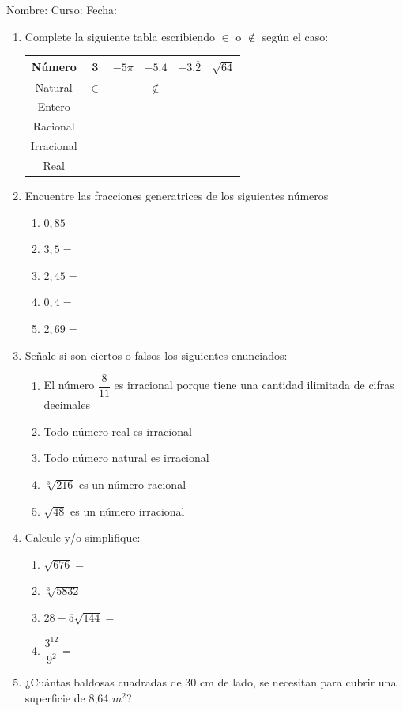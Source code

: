 \documentclass[fleqn]{article}
\newcommand{\LineaNombre}{%
\par
\vspace{\baselineskip}
Nombre:\hrulefill \; Curso: \underline{\hspace*{36pt}} \; Fecha: \underline{\hspace*{2.5cm}} \relax
\par}
\begin{document}
\LineaNombre
\begin{enumerate}
   \item Complete la siguiente tabla escribiendo $\in$ o $\not\in$ según el caso:
\begin{center}
   \begin{tabular}{|c|c|c|c|c|c|}
\hline 
Número & 3 & $-5\pi$ & $-5.4$ & $-3.\overline{2}$ & $\sqrt{64}$ \\ 
\hline 
Natural & $\in$ &  & $\not\in$ &  &  \\ 
\hline 
Entero &  &  &  &  &  \\ 
\hline 
Racional &  &  &  &  &  \\ 
\hline 
Irracional &  &  &  &  &  \\ 
\hline 
Real &  &  &  &  &  \\ 
\hline 
\end{tabular} 
\end{center}
 \item Encuentre las fracciones generatrices de los siguientes números
\begin{enumerate}
\item $0,85$\noanswer
\item $3,5=$\noanswer
\item $2,45=$\noanswer
\item $0,\overline{4}=$\noanswer
\item $2,6\overline{9}=$\noanswer
\end{enumerate}
\item Señale si son ciertos o falsos los siguientes enunciados:
\begin{enumerate}
\item El número $\dfrac{8}{11}$ es irracional porque tiene una cantidad ilimitada de cifras decimales \underline{\hspace*{20pt}}
\item Todo número real es irracional \underline{\hspace*{20pt}}
\newpage
\item Todo número natural es irracional \underline{\hspace*{20pt}}
\item $\sqrt[3]{216}$ es un número racional \underline{\hspace*{20pt}}
\item $\sqrt{48}$ es un número irracional \underline{\hspace*{20pt}}
\end{enumerate}
\item Calcule y/o simplifique:
\begin{enumerate}
\item $\sqrt{676}=$ \noanswer
\item $\sqrt[3]{5832}$\noanswer
\item $28-5\sqrt{144}=$\noanswer
\item $\dfrac{3^{12}}{9^{2}}=$\noanswer
\end{enumerate}
\item ¿Cuántas baldosas cuadradas de 30 cm de lado, se necesitan para cubrir una superficie de 8,64 $m^{2}$?\noanswer[2in]
\end{enumerate}
\end{document}
